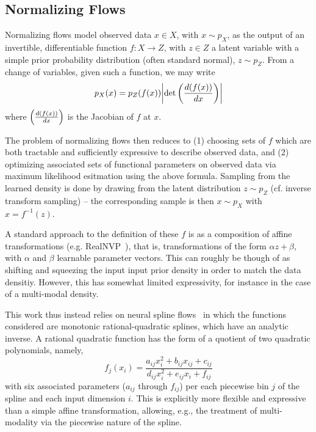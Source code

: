 \subsection{Normalizing Flows}
Normalizing flows model observed data $x\in X$, with $x \sim p_{X}$, as the output of an 
invertible, differentiable function $f: X \rightarrow Z$, with $z\in Z$ a latent 
variable with a simple prior probability distribution (often standard normal), $z\sim p_{Z}$. 
From a change of variables, given such a function, we may write
\begin{equation}
p_{X}(x) = p_{Z}(f(x))\qty|\det\qty(\frac{d(f(x))}{dx})|
\end{equation}
where $\qty(\frac{d(f(x))}{dx})$ is the Jacobian of $f$ at $x$.

The problem of normalizing flows then reduces to (1) choosing sets of $f$ which are 
both tractable and sufficiently expressive to describe observed data, and (2) optimizing 
associated sets of functional parameters on observed data via maximum likelihood esitmation 
using the above formula. Sampling from the learned density is done by drawing from the 
latent distribution $z\sim p_Z$ (cf. inverse transform sampling) -- the corresponding 
sample is then $x\sim p_X$ with $x=f^{-1}(z)$.

A standard approach to the definition of these $f$ is as a composition of affine transformations (e.g. 
RealNVP~\cite{RealNVP}), 
that is, transformations of the form $\alpha z + \beta$, with $\alpha$ and $\beta$ learnable 
parameter vectors. This can roughly be though of as shifting and squeezing the input
input prior density in order to match the data densitiy. However, this has somewhat limited expressivity, 
for instance in the case of a multi-modal density.

This work thus instead relies on neural spline flows~\cite{NeuralSplineFlows} 
in which the functions considered are monotonic rational-quadratic splines, which have an analytic inverse.
A rational quadratic function has the form of a quotient of two quadratic polynomials, namely,
\begin{equation}
f_j(x_i) = \frac{a_{ij} x_i^2 + b_{ij} x_{ij} + c_{ij}}{d_{ij}x_i^2 + e_{ij} x_i + f_{ij}}
\end{equation}
with six associated parameters ($a_{ij}$ through $f_{ij}$) per each piecewise bin $j$ of the spline and 
each input dimension $i$. This is explicitly more flexible and expressive than a simple affine 
transformation, allowing, e.g., the treatment of multi-modality via the piecewise nature of the spline. 

